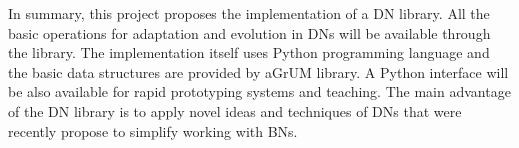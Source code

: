 In summary, this project proposes the implementation of a DN library.
All the basic operations for adaptation and evolution in DNs will be available through the library.
The implementation itself uses Python programming language and the basic data structures are provided by aGrUM library.
A Python interface will be also available for rapid prototyping systems and teaching.
The main advantage of the DN library is to apply novel ideas and techniques of DNs that were recently propose to simplify working with BNs.

